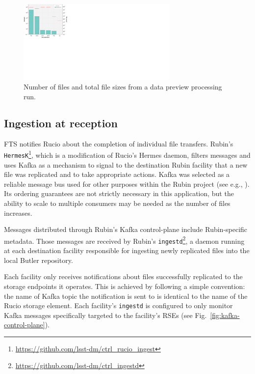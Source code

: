 \documentclass{webofc}
\begin{document}
\begin{figure}[h]
\includegraphics[width=0.7\textwidth, center]{images/file_count_and_file_sizes.pdf}
\caption{Number of files and total file sizes from a data preview processing run.}
\label{fig:filecount}
\end{figure}

\subsection{Ingestion at reception}
\label{ingestion}

FTS notifies Rucio about the completion of individual file transfers. Rubin's \texttt{HermesK}\footnote{\url{https://github.com/lsst-dm/ctrl_rucio_ingest}}, which is a modification of Rucio's Hermes daemon, filters messages and uses Kafka as a mechanism to signal to the destination Rubin facility that a new file was replicated and to take appropriate actions. Kafka was selected as a reliable message bus used for other purposes within the Rubin project (see e.g., \cite{2024SPIE13101E..1MF,2024SPIE13101E..18R}). Its ordering guarantees are not strictly necessary in this application, but the ability to scale to multiple consumers may be needed as the number of files increases.

Messages distributed through Rubin's Kafka control-plane include Rubin-specific metadata. Those messages are received by Rubin's \texttt{ingestd}\footnote{\url{https://github.com/lsst-dm/ctrl_ingestd}}, a daemon running at each destination facility responsible for ingesting newly replicated files into the local Butler repository.

Each facility only receives notifications about files successfully replicated to the storage endpoints it operates. This is achieved by following a simple convention: the name of Kafka topic the notification is sent to is identical to the name of the Rucio storage element. Each facility's \texttt{ingestd} is configured to only monitor Kafka messages specifically targeted to the facility's RSEs (see Fig.\ \ref{fig:kafka-control-plane}).
\end{document}
